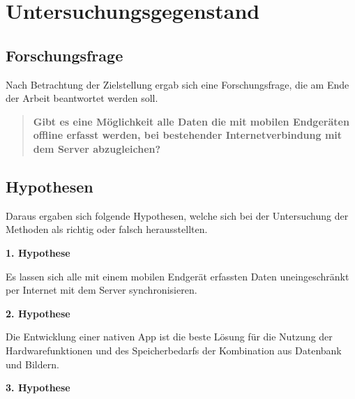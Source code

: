 \section{Untersuchungsgegenstand}
\label{sec:investigation:inv}

\subsection{Forschungsfrage}
\label{subsec:problem:prob}

Nach Betrachtung der Zielstellung ergab sich eine Forschungsfrage, die am Ende der Arbeit beantwortet werden soll.

\begin{quote}
	\textbf {Gibt es eine Möglichkeit alle Daten die mit mobilen Endgeräten offline erfasst werden, bei bestehender Internetverbindung mit dem Server abzugleichen?}
\end{quote}

\subsection{Hypothesen}
\label{subsec:hypothesis:hypo}

Daraus ergaben sich folgende Hypothesen, welche sich bei der Untersuchung der Methoden als richtig oder falsch herausstellten.

\textbf {1. Hypothese}

Es lassen sich alle mit einem mobilen Endgerät erfassten Daten uneingeschränkt per Internet mit dem Server synchronisieren.

\textbf {2. Hypothese}

Die Entwicklung einer nativen App ist die beste Lösung für die Nutzung der Hardwarefunktionen und des Speicherbedarfs der Kombination aus Datenbank und Bildern.

\textbf {3. Hypothese}
